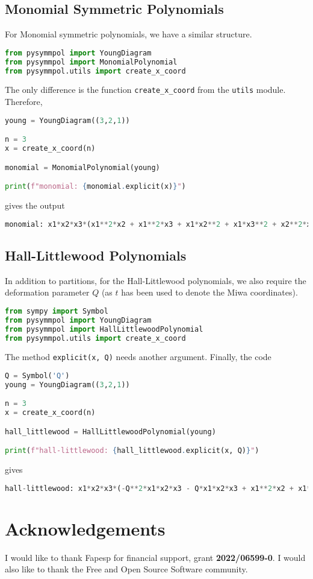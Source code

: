 \documentclass[a4paper,10pt]{amsart}
\begin{document}
\subsection{Monomial Symmetric Polynomials}

For Monomial symmetric polynomials, we have a similar structure. 
\begin{lstlisting}[language=Python]
from pysymmpol import YoungDiagram
from pysymmpol import MonomialPolynomial
from pysymmpol.utils import create_x_coord
\end{lstlisting}
The only difference is the function \verb|create_x_coord| from the
\verb|utils| module. Therefore,
\begin{lstlisting}[language=Python]
young = YoungDiagram((3,2,1))

n = 3
x = create_x_coord(n)

monomial = MonomialPolynomial(young)

print(f"monomial: {monomial.explicit(x)}")
\end{lstlisting}
gives the output 
\begin{lstlisting}[language=Python]
monomial: x1*x2*x3*(x1**2*x2 + x1**2*x3 + x1*x2**2 + x1*x3**2 + x2**2*x3 + x2*x3**2)
\end{lstlisting}

\subsection{Hall-Littlewood Polynomials}

In addition to partitions, for the Hall-Littlewood polynomials, 
we also require the deformation parameter \(Q\) (as \(t\) has been used to 
denote the Miwa coordinates).
\begin{lstlisting}[language=Python]
from sympy import Symbol
from pysymmpol import YoungDiagram
from pysymmpol import HallLittlewoodPolynomial
from pysymmpol.utils import create_x_coord
\end{lstlisting}
The method \verb|explicit(x, Q)| needs another argument. Finally, the code
\begin{lstlisting}[language=Python]
Q = Symbol('Q')
young = YoungDiagram((3,2,1))

n = 3
x = create_x_coord(n)

hall_littlewood = HallLittlewoodPolynomial(young)

print(f"hall-littlewood: {hall_littlewood.explicit(x, Q)}")
\end{lstlisting}
gives
\begin{lstlisting}[language=Python]
hall-littlewood: x1*x2*x3*(-Q**2*x1*x2*x3 - Q*x1*x2*x3 + x1**2*x2 + x1**2*x3 + x1*x2**2 + 2*x1*x2*x3 + x1*x3**2 + x2**2*x3 + x2*x3**2)
\end{lstlisting}

\section{Acknowledgements}

I would like to thank Fapesp for financial support, grant
\textbf{2022/06599-0}.  I would also like to thank the Free and Open Source
Software community.

\printbibliography
     
\end{document}
